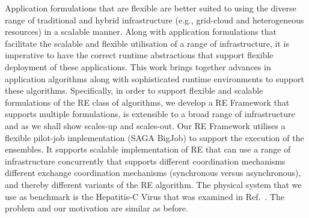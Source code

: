 \documentclass{rspublic}
\begin{document}
Application formulations that are flexible are better suited to using
the diverse range of traditional and hybrid infrastructure (e.g.,
grid-cloud and heterogeneous resources) in a scalable manner.  Along
with application formulations that facilitate the scalable and
flexible utilisation of a range of infrastructure, it is imperative to
have the correct runtime abstractions that support flexible deployment
of these applications. This work brings together advances in
application algorithms along with sophisticated runtime environments
to support these algorithms. Specifically, in order to support
flexible and scalable formulations of the RE class of algorithms, we
develop a RE Framework that supports multiple formulations, is
extensible to a broad range of infrastructure and as we shall show
scales-up and scales-out.  Our RE Framework utilises a flexible
pilot-job implementation (SAGA BigJob) to support the execution of the
ensembles.  It supports scalable implementation of RE that can use
a range of infrastructure concurrently that supports different
coordination mechanisms different exchange coordination mechanisms
(synchronous versus asynchronous), and thereby different variants of
the RE algorithm. The physical system that we use as benchmark is the
Hepatitis-C Virus that was examined in Ref.~\cite{Luckow:2008fp}. The
problem and our motivation are similar as before.

\end{document}
